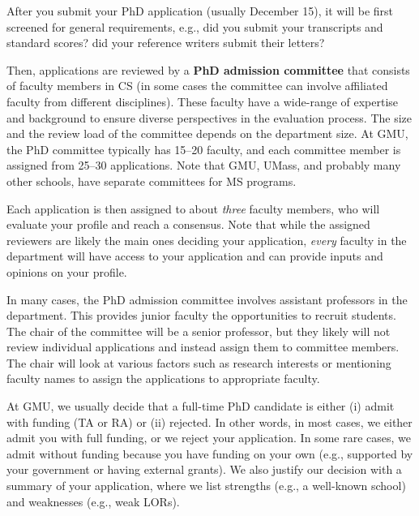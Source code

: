 \documentclass[11pt]{article}
\newcommand{\mycomment}[3][\color{blue}]{{#1{{#2}: {#3}}}}
\newcommand{\didi}[1]{\mycomment{Didier}{#1}}{}
\begin{document}
After you submit your PhD application (usually December 15), it will be first screened
for general requirements, e.g., did you submit your transcripts and standard scores? did your reference writers submit their letters?

Then, applications are reviewed by a \textbf{PhD admission committee} that consists of faculty members in CS (in some cases the committee can involve affiliated faculty from different disciplines). These faculty have a wide-range of expertise and background to ensure diverse perspectives in the evaluation process. The size and the review load of the committee depends on the department size. At GMU, the PhD committee typically has 15--20 faculty, and each committee member is assigned from 25--30 applications. Note that GMU, UMass, and probably many other schools, have separate committees for MS programs.

Each application is then assigned to about \emph{three} faculty members, who will evaluate your profile and reach a consensus.  Note that while the assigned reviewers are likely the main ones deciding your application, \emph{every} faculty in the department will have access to your application and can provide inputs and opinions on your profile.

In many cases, the PhD admission committee involves assistant professors in the department. This provides junior faculty the opportunities to recruit students. The chair of the committee will be a senior professor, but they likely will not review individual applications and instead assign them to committee members. The chair will look at various factors such as research interests or mentioning faculty names to assign the applications to appropriate faculty. 

At GMU, we usually decide that a full-time PhD candidate is either (i) admit with funding (TA or RA) or (ii) rejected. In other words, in most cases, we either
admit you with full funding, or we reject your application. In some rare cases, we admit
without funding because you have funding on your own (e.g.,
supported by your government or having external grants). We also justify
our decision with a summary of your application, where we list
strengths (e.g., a well-known school) and weaknesses (e.g., weak
LORs). 

\end{document}
